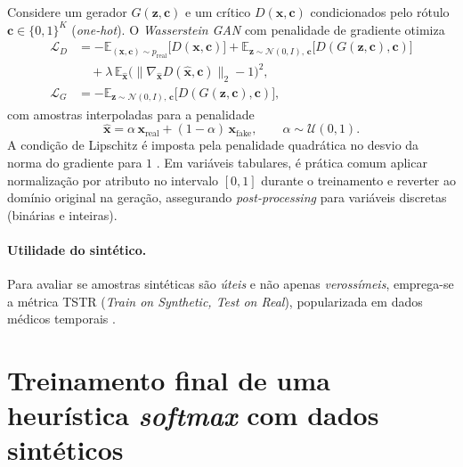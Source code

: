 \documentclass[12pt,a4paper]{report}
\begin{document}
Considere um gerador $G(\mathbf{z},\mathbf{c})$ e um crítico $D(\mathbf{x},\mathbf{c})$ condicionados pelo rótulo $\mathbf{c}\in\{0,1\}^K$ (\emph{one-hot}). O \emph{Wasserstein GAN} \cite{Arjovsky2017WGAN} com penalidade de gradiente \cite{Gulrajani2017ImprovedWGAN} otimiza
\begin{align}
\mathcal{L}_D
&= -\mathbb{E}_{(\mathbf{x},\mathbf{c})\sim p_{\text{real}}} \big[ D(\mathbf{x},\mathbf{c}) \big]
    + \mathbb{E}_{\mathbf{z}\sim\mathcal{N}(0,I),\,\mathbf{c}} \big[ D(G(\mathbf{z},\mathbf{c}),\mathbf{c}) \big] \nonumber\\
&\quad + \lambda \,\mathbb{E}_{\hat{\mathbf{x}}} \Big(\big\|\nabla_{\hat{\mathbf{x}}} D(\hat{\mathbf{x}},\mathbf{c})\big\|_2 - 1\Big)^2, \label{eq:ld}\\[3pt]
\mathcal{L}_G
&= -\mathbb{E}_{\mathbf{z}\sim\mathcal{N}(0,I),\,\mathbf{c}} \big[ D(G(\mathbf{z},\mathbf{c}),\mathbf{c}) \big], \label{eq:lg}
\end{align}
com amostras interpoladas para a penalidade
\begin{equation}
\hat{\mathbf{x}}=\alpha\,\mathbf{x}_{\text{real}}+(1-\alpha)\,\mathbf{x}_{\text{fake}},\qquad \alpha\sim\mathcal{U}(0,1).
\end{equation}
A condição de Lipschitz é imposta pela penalidade quadrática no desvio da norma do gradiente para $1$ \cite{Gulrajani2017ImprovedWGAN}. Em variáveis tabulares, é prática comum aplicar normalização por atributo no intervalo $[0,1]$ durante o treinamento e reverter ao domínio original na geração, assegurando \emph{post-processing} para variáveis discretas (binárias e inteiras).

\paragraph{Utilidade do sintético.}
Para avaliar se amostras sintéticas são \emph{úteis} e não apenas \emph{verossímeis}, emprega-se a métrica \textsc{TSTR} (\emph{Train on Synthetic, Test on Real}), popularizada em dados médicos temporais \cite{Yoon2019TimeGAN,Esteban2017RGAN}.

\section{Treinamento final de uma heurística \emph{softmax} com dados sintéticos}
\label{sec:heuristica}
\end{document}
